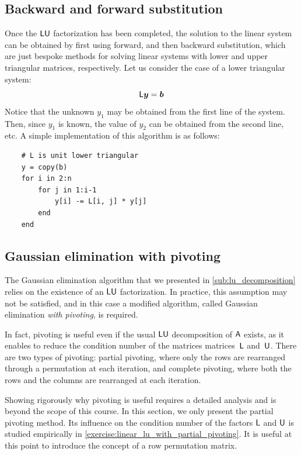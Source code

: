 \subsection{Backward and forward substitution}%
\label{sub:backward_and_forward_substitution}
Once the $\mathsf L \mathsf U$ factorization has been completed,
the solution to the linear system can be obtained by first using forward, and then backward substitution,
which are just bespoke methods for solving linear systems with lower and upper triangular matrices, respectively.
Let us consider the case of a lower triangular system:
\[
    \mathsf L \mathbf{\boldsymbol{y}} = \mathbf{\boldsymbol{b}}
\]
Notice that the unknown $y_1$ may be obtained from the first line of the system.
Then, since $y_1$ is known, the value of $y_2$ can be obtained from the second line, etc.
A simple implementation of this algorithm is as follows:
\begin{verbatim}
    # L is unit lower triangular
    y = copy(b)
    for i in 2:n
        for j in 1:i-1
            y[i] -= L[i, j] * y[j]
        end
    end
\end{verbatim}

\subsection{Gaussian elimination with pivoting~\moreinfo}%
\label{sub:pivoting}
The Gaussian elimination algorithm that
we presented in \cref{sub:lu_decomposition} relies on the existence of an $\mathsf L \mathsf U$ factorization.
In practice,
this assumption may not be satisfied,
and in this case a modified algorithm,
called Gaussian elimination \emph{with pivoting},
is required.

In fact, pivoting is useful even if the usual $\mathsf L \mathsf U$ decomposition of $\mathsf A$ exists,
as it enables to reduce the condition number of the matrices matrices~$\mathsf L$ and~$\mathsf U$.
There are two types of pivoting:
partial pivoting, where only the rows are rearranged through a permutation at each iteration,
and complete pivoting, where both the rows and the columns are rearranged at each iteration.

Showing rigorously why pivoting is useful requires a detailed analysis and is beyond the scope of this course.
In this section, we only present the partial pivoting method.
Its influence on the condition number of the factors $\mathsf L$ and $\mathsf U$ is studied empirically in \cref{exercise:linear_lu_with_partial_pivoting}.
It is useful at this point to introduce the concept of a row permutation matrix.

